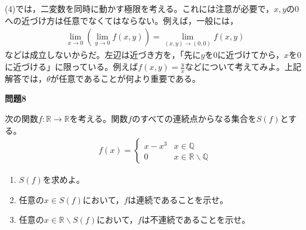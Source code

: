 \documentclass[a4paper,12pt,dvipdfmx,fleqn, oneside]{jsarticle}
\theoremstyle{defstyle}
\theoremstyle{thmx}
\theoremstyle{qesstyle}
\begin{document}
(4)では，二変数を同時に動かす極限を考える。これには注意が必要で，$x,y$の$0$への近づけ方は任意でなくてはならない。例えば，一般には，
\begin{align*}
    \lim_{x \to 0}\left( \lim_{y \to 0} f(x,y)\right) = \lim_{(x,y)\to (0,0)}f(x,y)
\end{align*}
などは成立しないからだ。左辺は近づき方を，「先に$y$を$0$に近づけてから，$x$を$0$に近づける」に限っている。例えば$f(x,y)=\frac{y}{x}$などについて考えてみよ。上記解答では，$\theta$が任意であることが何より重要である。
\begin{shadebox}
    \textbf{問題8}

    \text{　}次の関数$f: \mathbb{R} \rightarrow \mathbb{R}$を考える。関数$f$のすべての連続点からなる集合を$S(f)$とする。
    \begin{align*}
        f(x) =
        \begin{cases}
            x-x^3 & x \in \mathbb{Q}                       \\
            0     & x \in \mathbb{R} \backslash \mathbb{Q}
        \end{cases}
    \end{align*}
    \begin{enumerate}
        \item $S(f)$を求めよ。
        \item 任意の$x \in S(f)$において，$f$は連続であることを示せ。
        \item 任意の$x \in \mathbb{R} \backslash S(f)$において，$f$は不連続であることを示せ。
    \end{enumerate}
\end{shadebox}
\end{document}
